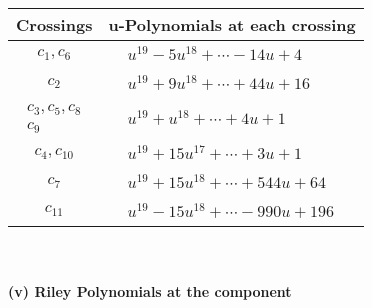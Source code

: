\documentclass[1p]{elsarticle_modified}
\theoremstyle{definition}
\begin{document}
\begin{tabular}{m{50pt}|m{274pt}}
Crossings & \hspace{64pt}u-Polynomials at each crossing \\
\hline $$\begin{aligned}c_{1},c_{6}\end{aligned}$$&$\begin{aligned}
&u^{19}-5 u^{18}+\cdots-14 u+4
\end{aligned}$\\
\hline $$\begin{aligned}c_{2}\end{aligned}$$&$\begin{aligned}
&u^{19}+9 u^{18}+\cdots+44 u+16
\end{aligned}$\\
\hline $$\begin{aligned}c_{3},c_{5},c_{8}\\c_{9}\end{aligned}$$&$\begin{aligned}
&u^{19}+u^{18}+\cdots+4 u+1
\end{aligned}$\\
\hline $$\begin{aligned}c_{4},c_{10}\end{aligned}$$&$\begin{aligned}
&u^{19}+15 u^{17}+\cdots+3 u+1
\end{aligned}$\\
\hline $$\begin{aligned}c_{7}\end{aligned}$$&$\begin{aligned}
&u^{19}+15 u^{18}+\cdots+544 u+64
\end{aligned}$\\
\hline $$\begin{aligned}c_{11}\end{aligned}$$&$\begin{aligned}
&u^{19}-15 u^{18}+\cdots-990 u+196
\end{aligned}$\\
\hline
\end{tabular}\\~\\
\newpage\renewcommand{\arraystretch}{1}
\flushleft \textbf{(v) Riley Polynomials at the component}\newline \\
\end{document}
